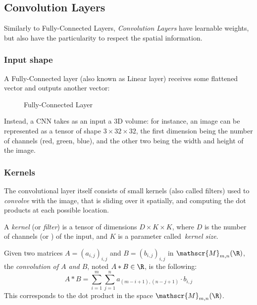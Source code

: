\subsection{Convolution Layers}
Similarly to Fully-Connected Layers, \emph{Convolution Layers} have learnable weights, but also have the particularity to respect the spatial information.

\subsubsection{Input shape}
A Fully-Connected layer (also known as Linear layer) receives some flattened vector and outputs another vector:
\begin{figure}[H]
    \centering
    \caption{Fully-Connected Layer}
\end{figure}

Instead, a CNN takes as an input a 3D volume: for instance, an image can be represented as a tensor of shape $3\times32\times32$, the first dimension being the number of channels (red, green, blue), and the other two being the width and height of the image.

\subsubsection{Kernels}
The convolutional layer itself consists of small kernels (also called filters) used to \emph{convolve} with the image, that is sliding over it spatially, and computing the dot products at each possible location.
\begin{definition}[Kernel]
    A \emph{kernel} (or \emph{filter}) is a tensor of dimensions $D\times K\times K$, where $D$ is the number of channels (or ) of the input, and $K$ is a parameter called \emph{kernel size}.
\end{definition}

\begin{definition}
    Given two matrices $A=(a_{i, j})_{i, j}$ and $B=(b_{i, j})_{i, j}$ in $\mathscr{M}_{m, n}(\R)$, the \emph{convolution of $A$ and $B$}, noted $A*B\in\R$, is the following:
    \begin{equation}
        A*B = \sum_{i=1}^m \sum_{j=1}^n a_{(m-i+1), (n-j+1)} \cdot b_{i, j}
    \end{equation}
    This corresponds to the dot product in the space $\mathscr{M}_{m, n}(\R)$.
\end{definition}

